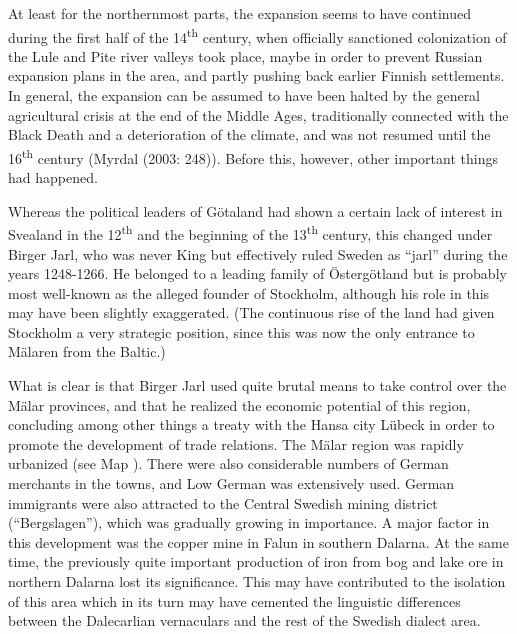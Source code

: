 At least for the northernmost parts, the expansion seems to have continued during the first half of the 14\textsuperscript{th} century, when officially sanctioned colonization of the Lule and Pite river valleys took place, maybe in order to prevent Russian expansion plans in the area, and partly pushing back earlier Finnish settlements. In general, the expansion can be assumed to have been halted by the general agricultural crisis at the end of the Middle Ages, traditionally connected with the Black Death and a deterioration of the climate, and was not resumed until the 16\textsuperscript{th} century (Myrdal (2003: 248)). Before this, however, other important things had happened.

Whereas the political leaders of Götaland had shown a certain lack of interest in Svealand in the 12\textsuperscript{th} and the beginning of the 13\textsuperscript{th} century, this changed under Birger Jarl, who was never King but effectively ruled Sweden as “jarl” during the years 1248-1266. He belonged to a leading family of Östergötland but is probably most well-known as the alleged founder of Stockholm, although his role in this may have been slightly exaggerated. (The continuous rise of the land had given Stockholm a very strategic position, since this was now the only entrance to Mälaren from the Baltic.)

What is clear is that Birger Jarl used quite brutal means to take control over the Mälar provinces, and that he realized the economic potential of this region, concluding among other things a treaty with the Hansa city Lübeck in order to promote the development of trade relations. The Mälar region was rapidly urbanized (see Map ). There were also considerable numbers of German merchants in the towns, and Low German was extensively used. German immigrants were also attracted to the Central Swedish mining district (“Bergslagen”), which was gradually growing in importance. A major factor in this development was the copper mine in Falun in southern Dalarna. At the same time, the previously quite important production of iron from bog and lake ore in northern Dalarna lost its significance. This may have contributed to the isolation of this area which in its turn may have cemented the linguistic differences between the Dalecarlian vernaculars and the rest of the Swedish dialect area. 

